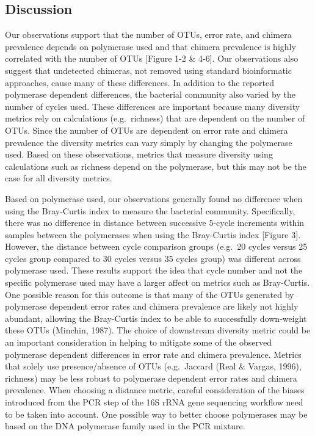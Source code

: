 \documentclass[11pt,]{article}
\begin{document}
\newpage

\subsection{Discussion}\label{discussion}

Our observations support that the number of OTUs, error rate, and
chimera prevalence depends on polymerase used and that chimera
prevalence is highly correlated with the number of OTUs {[}Figure 1-2 \&
4-6{]}. Our observations also suggest that undetected chimeras, not
removed using standard bioinformatic approaches, cause many of these
differences. In addition to the reported polymerase dependent
differences, the bacterial community also varied by the number of cycles
used. These differences are important because many diversity metrics
rely on calculations (e.g.~richness) that are dependent on the number of
OTUs. Since the number of OTUs are dependent on error rate and chimera
prevalence the diversity metrics can vary simply by changing the
polymerase used. Based on these observations, metrics that measure
diversity using calculations such as richness depend on the polymerase,
but this may not be the case for all diversity metrics.

Based on polymerase used, our observations generally found no difference
when using the Bray-Curtis index to measure the bacterial community.
Specifically, there was no difference in distance between successive
5-cycle increments within samples between the polymerases when using the
Bray-Curtis index {[}Figure 3{]}. However, the distance between cycle
comparison groups (e.g.~20 cycles versus 25 cycles group compared to 30
cycles versus 35 cycles group) was different across polymerase used.
These results support the idea that cycle number and not the specific
polymerase used may have a larger affect on metrics such as Bray-Curtis.
One possible reason for this outcome is that many of the OTUs generated
by polymerase dependent error rates and chimera prevalence are likely
not highly abundant, allowing the Bray-Curtis index to be able to
successfully down-weight these OTUs (Minchin, 1987). The choice of
downstream diversity metric could be an important consideration in
helping to mitigate some of the observed polymerase dependent
differences in error rate and chimera prevalence. Metrics that solely
use presence/absence of OTUs (e.g.~Jaccard (Real \& Vargas, 1996),
richness) may be less robust to polymerase dependent error rates and
chimera prevalence. When choosing a distance metric, careful
consideration of the biases introduced from the PCR step of the 16S rRNA
gene sequencing workflow need to be taken into account. One possible way
to better choose polymerases may be based on the DNA polymerase family
used in the PCR mixture.
\end{document}
